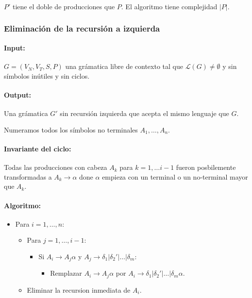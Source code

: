 \(P'\) tiene el doble de producciones que \(P\). El algoritmo tiene complejidad \(|P|\).

\subsubsection{Eliminación de la recursión a izquierda}
\paragraph{Input:} \(G = (V_N, V_T, S, P)\) una grámatica libre de contexto tal que \(\mathcal{L}(G)\neq\emptyset\) y sin símbolos inútiles y sin ciclos.

\paragraph{Output:} Una grámatica \(G'\) sin recursión izquierda que acepta el mismo lenguaje que \(G\).

Numeramos todos los símbolos no terminales \(A_1,\dots,A_n\).

\paragraph{Invariante del ciclo:} Todas las producciones con cabeza \(A_k\) para \(k = 1,\dots i-1\) fueron posbilemente transformadas a \(A_k\to\alpha\) done \(\alpha\) empieza con un terminal o un no-terminal mayor que \(A_k\).

\paragraph{Algoritmo:}
\begin{itemize}
  \item[] Para \(i = 1,\dots,n\):
    \begin{itemize}
      \item[] Para \(j = 1,\dots, i-1\):
        \begin{itemize}
          \item[] Si \(A_i\to A_j\alpha\) y  \(A_j\to\delta_1|\delta_2'|\dots|\delta_m\):
            \begin{itemize}
              \item[] Remplazar \(A_i\to A_j\alpha\) por \(A_i\to\delta_1|\delta_2'|\dots|\delta_m\alpha\).
            \end{itemize}
        \end{itemize}
      \item[] Eliminar la recursion inmediata de \(A_i\).
    \end{itemize}
\end{itemize}

